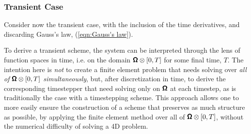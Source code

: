 \subsubsection*{Transient Case}

    Consider now the transient case, with the inclusion of the time derivatives, and discarding Gauss's law, (\ref{eqn:Gauss's law}).
    
    To derive a transient scheme, the system can be interpreted through the lens of function spaces in time, i.e. on the domain $\pmb{\mathsf{\Omega}}\otimes[0, T]$ for some final time, $T$. The intention here is \emph{not} to create a finite element problem that needs solving over \emph{all of $\pmb{\mathsf{\Omega}}\otimes[0, T]$ simultaneously}, but, after discretization in time, to derive the corresponding timestepper that need solving only on $\pmb{\mathsf{\Omega}}$ at each timestep, as is traditionally the case with a timestepping scheme. This approach allows one to more easily ensure the construction of a scheme that preserves as much structure as possible, by applying the finite element method over all of $\pmb{\mathsf{\Omega}}\otimes[0, T]$, without the numerical difficulty of solving a 4D problem.


